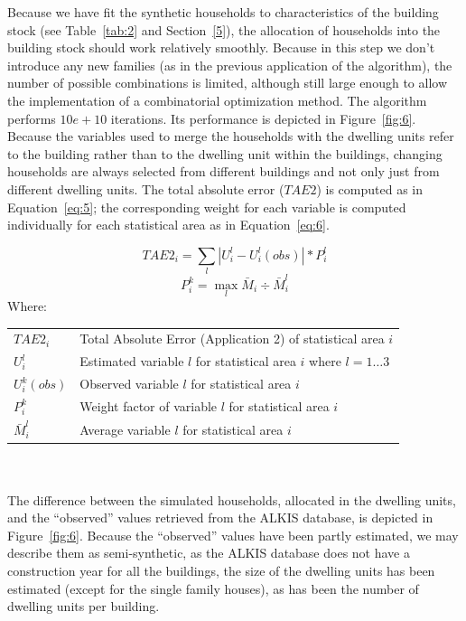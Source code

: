 \documentclass[11pt]{IJM-article}
\begin{document}
Because we have fit the synthetic households to characteristics of the building
stock (see Table~\ref{tab:2} and Section~\ref{5}), the allocation of households
into the building stock should work relatively smoothly. Because in this step
we don't introduce any new families (as in the previous application of the
algorithm), the number of possible combinations is limited, although still
large enough to allow the implementation of a combinatorial optimization
method. The algorithm performs $10e+10$ iterations. Its performance is depicted
in Figure~\ref{fig:6}. Because the variables used to merge the households with
the dwelling units refer to the building rather than to the dwelling unit
within the buildings, changing households are always selected from different
buildings and not only just from different dwelling units. The total absolute
error ($TAE2$) is computed as in Equation~\ref{eq:5}; the corresponding weight
for each variable is computed individually for each statistical area as in
Equation~\ref{eq:6}.\\

\parbox{\textwidth}{ 
    \begin{equation} 
    \label{eq:5} 
        TAE2_i = \sum_{l} |U_i^{l} - U_i^{l}(obs)| * P^l_i 
    \end{equation} 
    \begin{equation}
    \label{eq:6} 
        P^k_i = \max_l{\bar{M}_i} \div \bar{M}^l_i 
    \end{equation}
    \noindent Where:\\ 
    \begin{tabular}{lp{15cm}} 
        $TAE2_i$ & Total Absolute Error (Application 2) of statistical
            area $i$ \\ 
        $U_i^{l}$ & Estimated variable $l$ for statistical area $i$ where 
            $l = 1 \dots 3$ \\ 
        $U_i^{k}(obs)$ & Observed variable $l$ for statistical area $i$ \\ 
        $P_i^k$ & Weight factor of variable $l$ for statistical area $i$\\ 
        $\bar{M}^l_i$ & Average variable $l$ for statistical area $i$ 
    \end{tabular} 
}\\ \\

The difference between the simulated households, allocated in the dwelling
units, and the ``observed'' values retrieved from the ALKIS database, is
depicted in Figure~\ref{fig:6}. Because the ``observed'' values have been
partly estimated, we may describe them as semi-synthetic, as the ALKIS database
does not have a construction year for all the buildings, the size of the
dwelling units has been estimated (except for the single family houses), as has
been the number of dwelling units per building.\\
\end{document}
